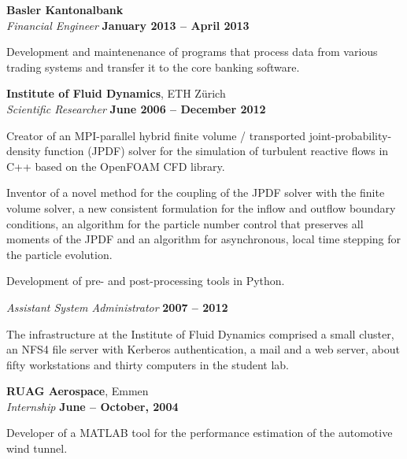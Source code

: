 \documentclass[line,11pt,a4paper]{../resume}
\begin{document}
\begin{resume}
\textbf{Basler Kantonalbank} \vspace{2mm}\\\vspace{1mm}%
\textsl{Financial Engineer} \hfill \textbf{January 2013 -- April 2013}\\
\begin{list2}
  \item Development and maintenenance of programs that process data from
    various trading systems and transfer it to the core banking software.
\end{list2}

\textbf{Institute of Fluid Dynamics}, ETH Z\"urich \vspace{2mm}\\\vspace{1mm}%
\textsl{Scientific Researcher} \hfill \textbf{June 2006 -- December 2012}\\
\begin{list2}
  \item Creator of an MPI-parallel hybrid finite volume / transported
    joint-probability-density function (JPDF) solver for the simulation of
    turbulent reactive flows in C++ based on the OpenFOAM CFD library.

  \item Inventor of a novel method for the coupling of the JPDF solver with the
    finite volume solver, a new consistent formulation for the inflow and
    outflow boundary conditions, an algorithm for the particle number control
    that preserves all moments of the JPDF and an algorithm for asynchronous,
    local time stepping for the particle evolution.

  \item Development of pre- and post-processing tools in Python.
\end{list2}

\textsl{Assistant System Administrator} \hfill \textbf{2007 -- 2012}\\
\begin{list2}
  \item The infrastructure at the Institute of Fluid Dynamics comprised a small
    cluster, an NFS4 file server with Kerberos authentication, a mail and a web
    server, about fifty workstations and thirty computers in the student lab.
\end{list2}

\textbf{RUAG Aerospace}, Emmen \vspace{2mm}\\\vspace{1mm}%
\textsl{Internship} \hfill \textbf{June -- October, 2004}\\
\begin{list2}
  \item Developer of a MATLAB tool for the performance estimation of the
    automotive wind tunnel.
\end{list2}


\end{resume}
\end{document}
